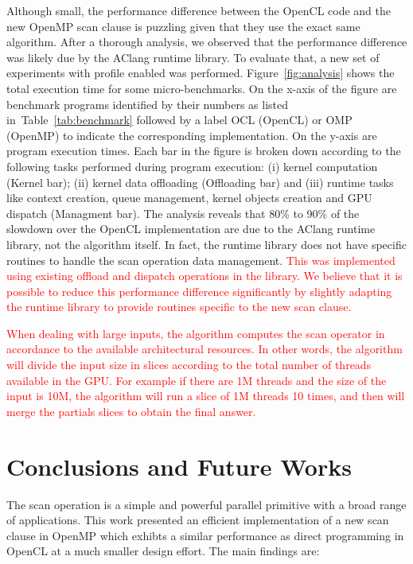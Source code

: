 \documentclass[Ingles]{ic-tese-v1}
\newcommand{\ed}[1]{\noindent\textcolor{red}{ {#1}}}
\newcommand{\ed}[1]{}
\newcommand{\rtab}[1]{Table~\ref{tab:#1}}
\begin{document}
Although small, the performance difference between the OpenCL code and
the new OpenMP  scan clause is puzzling given that  they use the exact
same   algorithm.  After a thorough analysis, we observed that the performance
difference was likely due by  the AClang runtime library.  To evaluate
that, a  new set of  experiments with profile enabled  was performed.
Figure~\ref{fig:analysis}  shows the  total  execution  time for  some
micro-benchmarks.  On the x-axis of  the figure are benchmark programs
identified by their numbers as  listed in~\rtab{benchmark} followed by
a label  OCL (OpenCL)  or OMP (OpenMP)  to indicate  the corresponding
implementation. On the  y-axis are program execution  times.  Each bar
in  the  figure  is  broken  down according  to  the  following  tasks
performed  during program  execution: (i)  kernel computation  (Kernel
bar);  (ii) kernel  data offloading  (Offloading bar)  and (iii)  runtime
tasks like context creation, queue management, kernel objects creation
and GPU dispatch  (Managment bar).  The analysis reveals  that 80\% to
90\% of  the slowdown over  the OpenCL  implementation are due  to the
AClang  runtime  library, not  the  algorithm  itself.  In  fact,  the
runtime library  does not  have specific routines  to handle  the scan
operation  data management.   \ed{This was  implemented using  existing
offload and dispatch operations in the library.  We believe that it is
possible  to  reduce  this  performance  difference  significantly  by
slightly adapting the runtime library  to provide routines specific to
the new scan clause.}

\ed{When dealing with  large inputs, the algorithm computes the scan operator
in accordance to the available architectural resources. In other words,
the algorithm will divide the input size in slices according to the total number of 
threads available in the GPU.  For example if there are 1M threads and the size of the input
is 10M, the algorithm will run a slice of 1M threads 10 times,  and then will
merge the partials slices to obtain the final answer.}

\chapter{Conclusions and Future Works}
\label{cap:Conclusion}

The scan operation is a simple  and powerful parallel primitive with a
broad  range  of  applications.   This  work  presented  an  efficient
implementation of a new scan clause in OpenMP which exhibts
a similar performance as direct programming in OpenCL at a much
smaller design effort. The main findings are:
\end{document}
